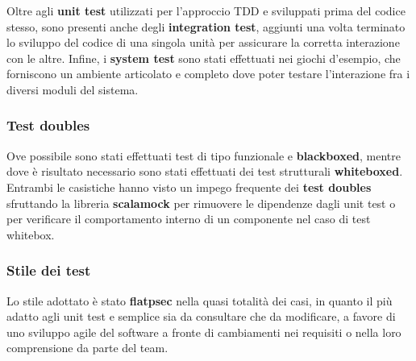 Oltre agli \textbf{unit test} utilizzati per l'approccio TDD e sviluppati prima del codice stesso, sono presenti anche degli \textbf{integration test}, aggiunti una volta terminato lo sviluppo del codice di una singola unità per assicurare la corretta interazione con le altre.
%
Infine, i \textbf{system test} sono stati effettuati nei giochi d'esempio, che forniscono un ambiente articolato e completo dove poter testare l'interazione fra i diversi moduli del sistema.
%

\subsubsection{Test doubles}
Ove possibile sono stati effettuati test di tipo funzionale e \textbf{blackboxed}, mentre dove è risultato necessario sono stati effettuati dei test strutturali \textbf{whiteboxed}.
%
Entrambi le casistiche hanno visto un impego frequente dei \textbf{test doubles} sfruttando la libreria \textbf{scalamock} per rimuovere le dipendenze dagli unit test o per verificare il comportamento interno di un componente nel caso di test whitebox.

\subsubsection{Stile dei test}
Lo stile adottato è stato \textbf{flatpsec} nella quasi totalità dei casi, in quanto il più adatto agli unit test e semplice sia da consultare che da modificare, a favore di uno sviluppo agile del software a fronte di cambiamenti nei requisiti o nella loro comprensione da parte del team.